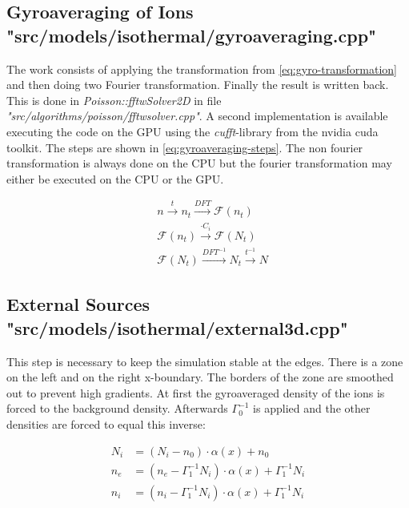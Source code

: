 \subsection{Gyroaveraging of Ions {\small "src/models/isothermal/gyroaveraging.cpp"}}
\label{sec:components-gryoaverage}
The work consists of applying the transformation from \autoref{eq:gyro-transformation} and then doing two Fourier transformation. Finally the result is written back. This is done in \textit{Poisson::fftwSolver2D} in file \textit{"src/algorithms/poisson/fftwsolver.cpp"}.
A second implementation is available executing the code on the GPU using the \textit{cufft}-library from the nvidia cuda toolkit. The steps are shown in \autoref{eq:gyroaveraging-steps}. The non fourier transformation is always done on the CPU but the fourier transformation may either be executed on the CPU or the GPU.

\begin{equation}\label{eq:gyroaveraging-steps}
    \begin{split}
    &n \overset{t}{\longrightarrow} n_t \overset{DFT}{\longrightarrow} \mathcal{F}(n_t)\\
    &\mathcal{F}(n_t) \overset{\cdot C_i}{\longrightarrow} \mathcal{F}(N_t)\\
    &\mathcal{F}(N_t) \overset{DFT^{-1}}{\longrightarrow} N_t \overset{t^{-1}}{\longrightarrow} N
    \end{split}
\end{equation}

\subsection{External Sources {\small "src/models/isothermal/external3d.cpp"}}
\label{sec:components-external}
This step is necessary to keep the simulation stable at the edges. There is a zone on the left and on the right x-boundary. The borders of the zone are smoothed out to prevent high gradients. At first the gyroaveraged density of the ions is forced to the background density. Afterwards $\Gamma_0^{-1}$ is applied and the other densities are forced to equal this inverse:

\begin{align}
    N_i &= (N_i - n_0) \cdot \alpha(x) + n_0\\
    n_e &= (n_e - \Gamma_1^{-1}N_i) \cdot \alpha(x) + \Gamma_1^{-1}N_i\\
    n_i &= (n_i - \Gamma_1^{-1}N_i) \cdot \alpha(x) + \Gamma_1^{-1}N_i
\end{align}
 
